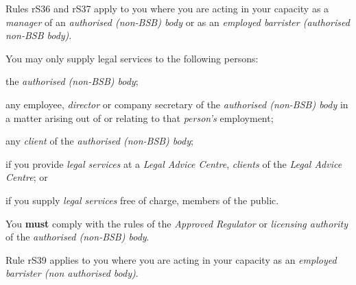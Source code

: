 


Rules rS36 and rS37 apply to you where you are acting in your capacity
as a \emph{manager} of an \emph{authorised (non-BSB) body} or as an
\emph{employed barrister (authorised non-BSB body)}.


You may only supply legal services to the following persons:\nl\item the \emph{authorised (non-BSB) body};
\item any employee, \emph{director} or company secretary of the
\emph{authorised (non-BSB) body} in a matter arising out of or relating
to that \emph{person's} employment;
\item any \emph{client} of the \emph{authorised (non-BSB) body};
\item if you provide \emph{legal services} at a \emph{Legal Advice Centre},
\emph{clients} of the \emph{Legal Advice Centre}; or
\item if you supply \emph{legal services} free of charge, members of the
public.\ln


You \textcolor{myred}{\textbf{must }}comply with the rules of the \emph{Approved Regulator} or
\emph{licensing authority} of the \emph{authorised (non-BSB) body}.




Rule rS39 applies to you where you are acting in your capacity as an
\emph{employed barrister (non authorised body)}.


